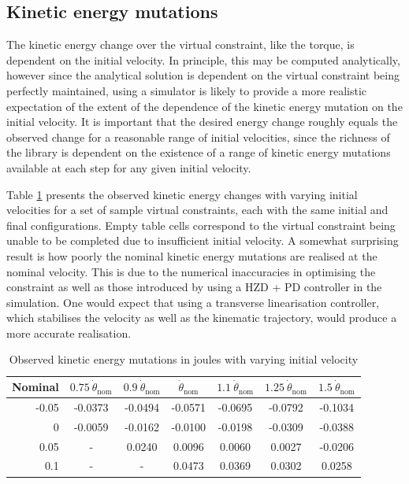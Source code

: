 \subsection{Kinetic energy mutations} \label{sec:reskineng}
The kinetic energy change over the virtual constraint, like the torque, is dependent on the initial velocity. In principle, this may be computed analytically, however since the analytical solution is dependent on the virtual constraint being perfectly maintained, using a simulator is likely to provide a more realistic expectation of the extent of the dependence of the kinetic energy mutation on the initial velocity. It is important that the desired energy change roughly equals the observed change for a reasonable range of initial velocities, since the richness of the library is dependent on the existence of a range of kinetic energy mutations available at each step for any given initial velocity.

Table \ref{tab:vcenergy} presents the observed kinetic energy changes with varying initial velocities for a set of sample virtual constraints, each with the same initial and final configurations. Empty table cells correspond to the virtual constraint being unable to be completed due to insufficient initial velocity. A somewhat surprising result is how poorly the nominal kinetic energy mutations are realised at the nominal velocity. This is due to the numerical inaccuracies in optimising the constraint as well as those introduced by using a HZD + PD controller in the simulation. One would expect that using a transverse linearisation controller, which stabilises the velocity as well as the kinematic trajectory, would produce a more accurate realisation. 

\begin{table}
	\centering
	\begin{tabular}{ r || c | c | c | c | c | c}
		Nominal & $0.75~\dot{\theta}_{\mathrm{nom}}$ & $0.9~\dot{\theta}_{\mathrm{nom}}$ & $\dot{\theta}_{\mathrm{nom}}$ & $1.1~\dot{\theta}_{\mathrm{nom}}$ & $1.25~\dot{\theta}_{\mathrm{nom}}$ & $1.5~\dot{\theta}_{\mathrm{nom}}$ \\ \hline
		-0.05 & -0.0373 & -0.0494 & -0.0571 & -0.0695 & -0.0792 & -0.1034  \\
		0     & -0.0059 & -0.0162 & -0.0100 & -0.0198 & -0.0309 & -0.0388 \\
		0.05  &    -    &  0.0240 &  0.0096 &  0.0060 &  0.0027 & -0.0206  \\
		0.1   &    -    &    -    &  0.0473 &  0.0369 &  0.0302 &  0.0258
	\end{tabular}
	\caption[Observed kinetic energy mutations with varying initial velocity]{Observed kinetic energy mutations in joules with varying initial velocity}
	\label{tab:vcenergy}
\end{table}

